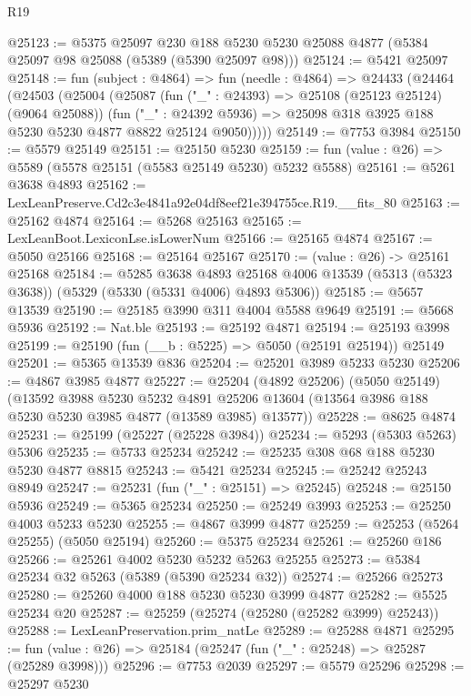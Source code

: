 \begin{lexlean}{R19}
\begin{coremodule}
@25123 := @5375
    @25097
    @230
    @188
    @5230
    @5230
    @25088
    @4877
    (@5384 @25097 @98 @25088 (@5389 (@5390 @25097 @98)))
@25124 := @5421 @25097
@25148 := fun (subject : @4864) =>
  fun (needle : @4864) =>
  @24433
    (@24464
      (@24503
        (@25004
          (@25087
            (fun ("_" : @24393) => @25108 (@25123 @25124) (@9064 @25088))
            (fun ("_" : @24392 @5936) =>
            @25098 @318 @3925 @188 @5230 @5230 @4877 @8822 @25124 @9050)))))
@25149 := @7753 @3984
@25150 := @5579 @25149
@25151 := @25150 @5230
@25159 := fun (value : @26) => @5589 (@5578 @25151 (@5583 @25149 @5230) @5232 @5588)
@25161 := @5261 @3638 @4893
@25162 := LexLeanPreserve.Cd2c3e4841a92e04df8eef21e394755ce.R19.__fits_80
@25163 := @25162 @4874
@25164 := @5268 @25163
@25165 := LexLeanBoot.LexiconLse.isLowerNum
@25166 := @25165 @4874
@25167 := @5050 @25166
@25168 := @25164 @25167
@25170 := (value : @26) -> @25161 @25168
@25184 := @5285
    @3638
    @4893
    @25168
    @4006
    @13539
    (@5313 (@5323 @3638))
    (@5329 (@5330 (@5331 @4006) @4893 @5306))
@25185 := @5657 @13539
@25190 := @25185 @3990 @311 @4004 @5588 @9649
@25191 := @5668 @5936
@25192 := Nat.ble
@25193 := @25192 @4871
@25194 := @25193 @3998
@25199 := @25190 (fun (__b : @5225) => @5050 (@25191 @25194)) @25149
@25201 := @5365 @13539 @836
@25204 := @25201 @3989 @5233 @5230
@25206 := @4867 @3985 @4877
@25227 := @25204
    (@4892 @25206)
    (@5050 @25149)
    (@13592
      @3988
      @5230
      @5232
      @4891
      @25206
      @13604
      (@13564 @3986 @188 @5230 @5230 @3985 @4877 (@13589 @3985) @13577))
@25228 := @8625 @4874
@25231 := @25199 (@25227 (@25228 @3984))
@25234 := @5293 (@5303 @5263) @5306
@25235 := @5733 @25234
@25242 := @25235 @308 @68 @188 @5230 @5230 @4877 @8815
@25243 := @5421 @25234
@25245 := @25242 @25243 @8949
@25247 := @25231 (fun ("_" : @25151) => @25245)
@25248 := @25150 @5936
@25249 := @5365 @25234
@25250 := @25249 @3993
@25253 := @25250 @4003 @5233 @5230
@25255 := @4867 @3999 @4877
@25259 := @25253 (@5264 @25255) (@5050 @25194)
@25260 := @5375 @25234
@25261 := @25260 @186
@25266 := @25261 @4002 @5230 @5232 @5263 @25255
@25273 := @5384 @25234 @32 @5263 (@5389 (@5390 @25234 @32))
@25274 := @25266 @25273
@25280 := @25260 @4000 @188 @5230 @5230 @3999 @4877
@25282 := @5525 @25234 @20
@25287 := @25259 (@25274 (@25280 (@25282 @3999) @25243))
@25288 := LexLeanPreservation.prim_natLe
@25289 := @25288 @4871
@25295 := fun (value : @26) => @25184 (@25247 (fun ("_" : @25248) => @25287 (@25289 @3998)))
@25296 := @7753 @2039
@25297 := @5579 @25296
@25298 := @25297 @5230

\end{coremodule}
\end{lexlean}
